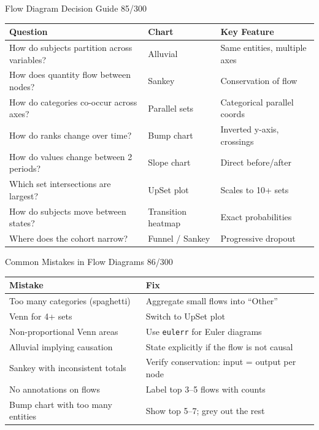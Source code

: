 \documentclass[10pt]{beamer}
\newcommand{\smark}[1]{\hfill{\scriptsize\color{codegray}#1}}
\begin{document}
\begin{frame}{Flow Diagram Decision Guide}
\smark{85/300}
\centering\small
\begin{tabular}{@{}lll@{}}
    \toprule
    \textbf{Question} & \textbf{Chart} & \textbf{Key Feature} \\
    \midrule
    How do subjects partition across variables?  & Alluvial      & Same entities, multiple axes \\
    How does quantity flow between nodes?         & Sankey        & Conservation of flow \\
    How do categories co-occur across axes?       & Parallel sets & Categorical parallel coords \\
    How do ranks change over time?                & Bump chart    & Inverted y-axis, crossings \\
    How do values change between 2 periods?       & Slope chart   & Direct before/after \\
    Which set intersections are largest?           & UpSet plot    & Scales to 10+ sets \\
    How do subjects move between states?           & Transition heatmap & Exact probabilities \\
    Where does the cohort narrow?                  & Funnel / Sankey & Progressive dropout \\
    \bottomrule
\end{tabular}
\end{frame}

\begin{frame}{Common Mistakes in Flow Diagrams}
\smark{86/300}
\centering\small
\begin{tabular}{@{}ll@{}}
    \toprule
    \textbf{Mistake} & \textbf{Fix} \\
    \midrule
    Too many categories (spaghetti)          & Aggregate small flows into ``Other'' \\
    Venn for 4+ sets                         & Switch to UpSet plot \\
    Non-proportional Venn areas              & Use \texttt{eulerr} for Euler diagrams \\
    Alluvial implying causation              & State explicitly if the flow is not causal \\
    Sankey with inconsistent totals          & Verify conservation: input = output per node \\
    No annotations on flows                  & Label top 3--5 flows with counts \\
    Bump chart with too many entities         & Show top 5--7; grey out the rest \\
    \bottomrule
\end{tabular}
\end{frame}
\end{document}
